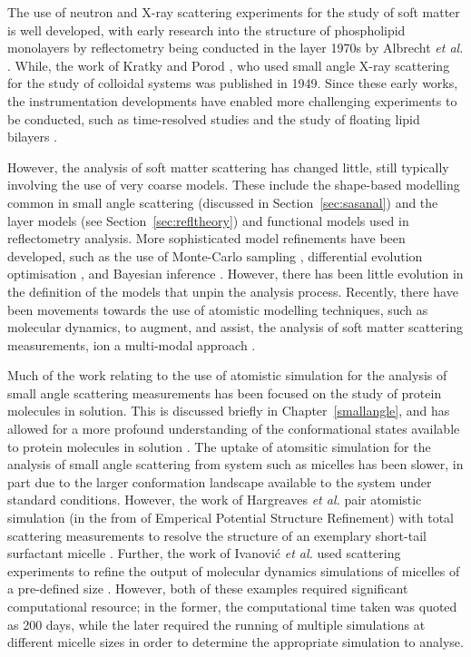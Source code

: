 The use of neutron and X-ray scattering experiments for the study of soft matter is well developed, with early research into the structure of phospholipid monolayers by reflectometry being conducted in the layer 1970s by Albrecht \emph{et al.} \cite{albrecht_polymorphism_1978}.
While, the work of Kratky and Porod \cite{kratky_diffuse_1949}, who used small angle X-ray scattering for the study of colloidal systems was published in 1949.
Since these early works, the instrumentation developments have enabled more challenging experiments to be conducted, such as time-resolved studies \cite{jensen_monitoring_2014} and the study of floating lipid bilayers \cite{rondelli_reflectivity_2012}.

However, the analysis of soft matter scattering has changed little, still typically involving the use of very coarse models.
These include the shape-based modelling common in small angle scattering (discussed in Section~\ref{sec:sasanal}) \cite{hassan_small_2003} and the layer models (see Section~\ref{sec:refltheory}) \cite{campbell_structure_2018} and functional models \cite{lu_analysis_1996} used in reflectometry analysis.
More sophisticated model refinements have been developed, such as the use of Monte-Carlo sampling \cite{pedersen_monte_2002}, differential evolution optimisation \cite{wormington_characterization_1999}, and Bayesian inference \cite{nelson_refnx_2019}.
However, there has been little evolution in the definition of the models that unpin the analysis process.
Recently, there have been movements towards the use of atomistic modelling techniques, such as molecular dynamics, to augment, and assist, the analysis of soft matter scattering measurements, ion a multi-modal approach \cite{scoppola_combining_2018}.

Much of the work relating to the use of atomistic simulation for the analysis of small angle scattering measurements has been focused on the study of protein molecules in solution.
This is discussed briefly in Chapter~\ref{smallangle}, and has allowed for a more profound understanding of the conformational states available to protein molecules in solution \cite{bowerman_determining_2017}.
The uptake of atomsitic simulation for the analysis of small angle scattering from system such as micelles has been slower, in part due to the larger conformation landscape available to the system under standard conditions.
However, the work of Hargreaves \emph{et al.} pair atomistic simulation (in the from of Emperical Potential Structure Refinement) with total scattering measurements to resolve the structure of an exemplary short-tail surfactant micelle \cite{hargreaves_atomistic_2011}.
Further, the work of Ivanovi\'{c} \emph{et al.} used scattering experiments to refine the output of molecular dynamics simulations of micelles of a pre-defined size \cite{ivanovic_temperature-dependent_2018}.
However, both of these examples required significant computational resource; in the former, the computational time taken was quoted as 200 days, while the later required the running of multiple simulations at different micelle sizes in order to determine the appropriate simulation to analyse.

